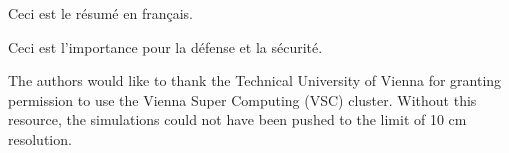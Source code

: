\documentclass[pdfa]{drdc-report}
\begin{document}
\begin{fabstract}
  Ceci est le r\'esum\'e en fran\c{c}ais.
\end{fabstract}

\begin{fsignificance}
  Ceci est l'importance pour la d\'efense et la s\'ecurit\'e.
\end{fsignificance}

\tableofcontents\clearpage
\listoffigures\clearpage
\listoftables
\begin{acknowledgements}
The authors would like to thank the Technical University of Vienna for granting permission to use the Vienna Super Computing (VSC) cluster. Without this resource, the simulations could not have been pushed to the limit of 10 cm resolution.
\end{acknowledgements}
\let\cleardoublepage\clearpage




















\clearpage
\printbibliography
% 
% 
 
\end{document}
